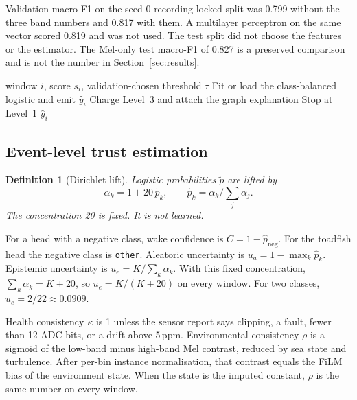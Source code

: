 \documentclass[sn-mathphys-num]{sn-jnl}%
\theoremstyle{thmstyleone}%
\theoremstyle{thmstyletwo}%
\theoremstyle{thmstylethree}%
\newtheorem{definition}{Definition}%
\begin{document}
Validation macro-F1 on the seed-0 recording-locked split was 0.799 without the three band numbers and 0.817 with them. A multilayer perceptron on the same vector scored 0.819 and was not used. The test split did not choose the features or the estimator. The Mel-only test macro-F1 of 0.827 is a preserved comparison and is not the number in Section~\ref{sec:results}.

\begin{algorithm}[!htbp]
\caption{One-threshold explanation gate. The logistic label is emitted on both branches.}
\label{alg:gate}
\begin{algorithmic}
\Require window $i$, score $s_i$, validation-chosen threshold $\tau$
\State Fit or load the class-balanced logistic and emit $\hat{y}_i$
    \State Charge Level~3 and attach the graph explanation
\Else
    \State Stop at Level~1
\EndIf
\State \Return $\hat{y}_i$
\end{algorithmic}
\end{algorithm}

\subsection{Event-level trust estimation}\label{sec:trust}

\begin{definition}[Dirichlet lift]
Logistic probabilities $\tilde{p}$ are lifted by
\begin{equation}
\alpha_k = 1 + 20\,\tilde{p}_k, \qquad \hat{p}_k = \alpha_k \Big/ \sum_j \alpha_j.
\label{eq:lift}
\end{equation}
The concentration 20 is fixed. It is not learned.
\end{definition}

For a head with a negative class, wake confidence is $C = 1 - \hat{p}_{\mathrm{neg}}$. For the toadfish head the negative class is \texttt{other}. Aleatoric uncertainty is $u_a = 1 - \max_k \hat{p}_k$. Epistemic uncertainty is $u_e = K / \sum_k \alpha_k$. With this fixed concentration, $\sum_k \alpha_k = K + 20$, so $u_e = K/(K+20)$ on every window. For two classes, $u_e = 2/22 \approx 0.0909$.

Health consistency $\kappa$ is 1 unless the sensor report says clipping, a fault, fewer than 12 ADC bits, or a drift above 5\,ppm. Environmental consistency $\rho$ is a sigmoid of the low-band minus high-band Mel contrast, reduced by sea state and turbulence. After per-bin instance normalisation, that contrast equals the FiLM bias of the environment state. When the state is the imputed constant, $\rho$ is the same number on every window.
\end{document}
